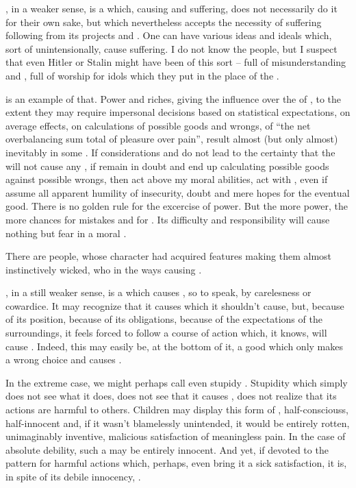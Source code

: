 {\pa \mine 
{}, in a weaker sense, is a  which, causing
 and suffering, does not necessarily do it for their own sake, but
which nevertheless accepts the necessity of suffering following from
its projects and .  One can have various ideas and ideals
which, sort of unintensionally, cause suffering.  I do not know the
people, but I suspect that even Hitler or Stalin might have been of
this sort --  full of misunderstanding and ,
 full of worship for idols which they put in the place of
the .

 is an example of that.  Power and riches,
giving the influence over the  of
, to the extent they may require impersonal decisions
based on statistical expectations, on average effects, on calculations
of possible goods and wrongs, of ``the net overbalancing sum total of
pleasure over pain'', result almost (but only almost) inevitably in
some .  If  considerations and  do not lead
to the certainty that the  will not cause any , if
 remain in doubt and end up calculating possible goods against
possible wrongs, then  act above my moral abilities,  act
with , even if  assume all apparent humility of
insecurity, doubt and mere hopes for the eventual good.  There is no
golden rule for the excercise of power.  But the more power, the more
chances for mistakes and for .  Its difficulty and responsibility
will cause nothing but fear in a moral .  

There are people, whose character had acquired features making 
them almost instinctively wicked, who   in the ways 
causing . 


\pa \act
{}, in a still weaker sense, is a  which causes , so to 
speak, by carelesness or cowardice. It may recognize that it causes
 which it shouldn't cause, but, because of 
its position, because of its obligations, because of the expectations 
of the surroundings, it feels forced to follow a course of action which, it 
knows, will cause . Indeed, this may 
easily be, at the bottom of it, a good  which only makes a 
wrong choice and causes .

\pa \imm
In the extreme case, we might perhaps call even stupidy . 
Stupidity which simply does not see what it does, does not see that it 
causes , does not realize that its actions are harmful to others. 
Children may display this form of , half-consciouss, 
half-innocent and, if it wasn't blamelessly unintended, it would be 
entirely rotten, unimaginably inventive, malicious satisfaction of meaningless pain.
In the case of absolute debility, such a  may be entirely 
innocent. And yet, if devoted to the pattern for harmful actions 
which, perhaps, even bring it a sick satisfaction, it is, in spite of 
its debile innocency, .

}

